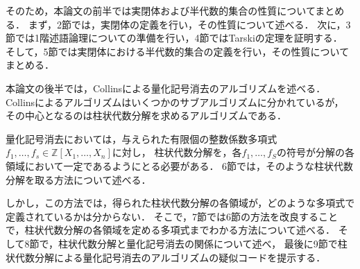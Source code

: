 \documentclass[uplatex, dvipdfmx]{jsarticle}
\theoremstyle{definition}
\begin{document}
そのため，本論文の前半では実閉体および半代数的集合の性質についてまとめる．
まず，2節では，実閉体の定義を行い，その性質について述べる．
次に，3節では1階述語論理についての準備を行い，4節ではTarskiの定理を証明する．
そして，5節では実閉体における半代数的集合の定義を行い，その性質についてまとめる．

本論文の後半では，Collinsによる量化記号消去のアルゴリズムを述べる．
Collinsによるアルゴリズムはいくつかのサブアルゴリズムに分かれているが，
その中心となるのは柱状代数分解を求めるアルゴリズムである．

量化記号消去においては，与えられた有限個の整数係数多項式$f_1, \dots, f_s \in \mathbb{Z}[X_1, \dots, X_n]$に対し，
柱状代数分解を，各$f_1, \dots, f_S$の符号が分解の各領域において一定であるようにとる必要がある．
6節では，そのような柱状代数分解を取る方法について述べる．

しかし，この方法では，得られた柱状代数分解の各領域が，どのような多項式で定義されているかは分からない．
そこで，7節では6節の方法を改良することで，柱状代数分解の各領域を定める多項式までわかる方法について述べる．
そして8節で，柱状代数分解と量化記号消去の関係について述べ，
最後に9節で柱状代数分解による量化記号消去のアルゴリズムの疑似コードを提示する．



\end{document}
